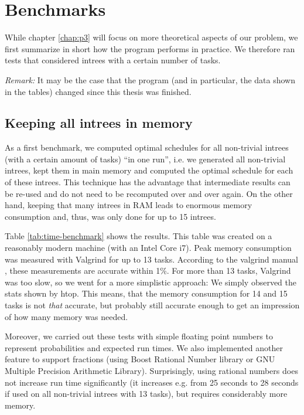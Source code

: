 \chapter{Benchmarks}
\label{chap:benchmarks}

While chapter \ref{chap:p3} will focus on more theoretical aspects of our problem, we first summarize in short how the program performs in practice. We therefore ran tests that considered intrees with a certain number of tasks.

\emph{Remark:} It may be the case that the program (and in particular, the data shown in the tables) changed since this thesis was finished.

\section{Keeping all intrees in memory}
\label{sec:benchmarks-all-intrees-in-memory}

As a first benchmark, we computed optimal schedules for all non-trivial intrees (with a certain amount of tasks) ``in one run'', i.e. we generated all non-trivial intrees, kept them in main memory and computed the optimal schedule for each of these intrees. This technique has the advantage that intermediate results can be re-used and do not need to be recomputed over and over again. On the other hand, keeping that many intrees in RAM leads to enormous memory consumption and, thus, was only done for up to 15 intrees.

Table \ref{tab:time-benchmark} shows the results. This table was created on a reasonably modern machine (with an Intel Core i7). Peak memory consumption was measured with Valgrind for up to 13 tasks. According to the valgrind manual \cite{massifmanual}, these measurements are accurate within 1\%. For more than 13 tasks, Valgrind was too slow, so we went for a more simplistic approach: We simply observed the stats shown by htop. This means, that the memory consumption for 14 and 15 tasks is not \emph{that} accurate, but probably still accurate enough to get an impression of how many memory was needed.

Moreover, we carried out these tests with simple floating point numbers to represent probabilities and expected run times. We also implemented another feature to support fractions (using Boost Rational Number library or GNU Multiple Precision Arithmetic Library). Surprisingly, using rational numbers does not increase run time significantly (it increases e.g. from 25 seconds to 28 seconds if used on all non-trivial intrees with 13 tasks), but requires considerably more memory.

